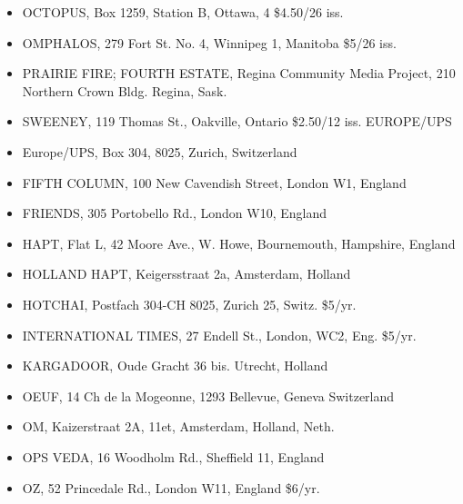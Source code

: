 \documentclass[11pt,twoside,a4paper]{book}
\begin{document}
\begin{minipage}[t]{0.20\textwidth}
\begin{scriptsize}
\begin{itemize}
	\item[] OCTOPUS, Box 1259, Station B, Ottawa, 4 \$4.50/26 iss. 
	\item[] OMPHALOS, 279 Fort St. No. 4, Winnipeg 1, Manitoba \$5/26 iss. 
	\item[] PRAIRIE FIRE; FOURTH ESTATE, Regina Community Media Project, 210 Northern Crown 	Bldg. Regina, Sask. 
	\item[] SWEENEY, 119 Thomas St., Oakville, Ontario \$2.50/12 iss. EUROPE/UPS 
	\item[] Europe/UPS, Box 304, 8025, Zurich, Switzerland 
	\item[] FIFTH COLUMN, 100 New Cavendish Street, London W1, England 
	\item[] FRIENDS, 305 Portobello Rd., London W10, England 
	\item[] HAPT, Flat L, 42 Moore Ave., W. Howe, Bournemouth, Hampshire,	England \item[] HOLLAND HAPT, 	Keigersstraat 2a, Amsterdam, Holland 
	\item[] HOTCHAI, Postfach 304-CH 8025, Zurich 25, Switz. \$5/yr. 
	\item[] INTERNATIONAL TIMES, 27 Endell St., London, WC2, Eng. \$5/yr. 
	\item[] KARGADOOR, Oude Gracht 36 bis. Utrecht, Holland 
	\item[] OEUF, 14 Ch de la Mogeonne, 1293 Bellevue, Geneva Switzerland 
	\item[] OM, Kaizerstraat 2A, 11et, Amsterdam, Holland, Neth. 
	\item[] OPS VEDA, 16 Woodholm Rd., Sheffield 11, England 
	\item[] OZ, 52 Princedale Rd., London W11, 	England \$6/yr. 
\end{itemize}
\end{scriptsize}
\end{minipage}\hfill
\end{document}
